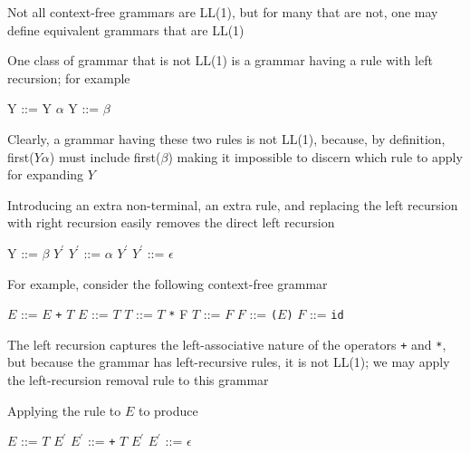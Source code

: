 \documentclass[8pt,a4paper,compress]{beamer}
\newcommand{\mm}[1]{$#1$}
\newcommand{\expo}[2]{$#1^{#2}$}
\newenvironment{spaced}
{
\smallskip
\hspace{.5cm}
\begin{minipage}[c]{\textwidth}
}
{
\end{minipage}
\smallskip
}
\begin{document}
\begin{frame}[fragile]
\pause

Not all context-free grammars are LL(1), but for many that are not, one may define equivalent grammars that are LL(1)

\pause
\bigskip

One class of grammar that is not LL(1) is a grammar having a rule with left recursion; for example 

\text{ }
\begin{spaced}
\begin{production}
Y ::= Y \mm{\alpha}
Y ::= \mm{\beta}
\end{production}
\end{spaced}

\pause

Clearly, a grammar having these two rules is not LL(1), because, by definition, first($Y \alpha$) must include first($\beta$) making it impossible to discern which rule to apply for expanding $Y$

\pause
\bigskip

Introducing an extra non-terminal, an extra rule, and replacing the left recursion with right recursion easily removes the direct left recursion

\text{ }
\begin{spaced}
\begin{production}
Y  ::= \mm{\beta} \expo{Y}{\prime}
\expo{Y}{\prime} ::= \mm{\alpha} \expo{Y}{\prime}
\expo{Y}{\prime} ::= \mm{\epsilon}
\end{production}
\end{spaced}
\end{frame}

\begin{frame}[fragile]
\pause

For example, consider the following context-free grammar

\text{ }
\begin{spaced}
\begin{production}
\mm{E} ::= \mm{E} \lstinline{+} \mm{T}
\mm{E} ::= \mm{T}
\mm{T} ::= \mm{T}  \lstinline{*} {F}
\mm{T} ::= \mm{F}
\mm{F} ::= \lstinline{(}\mm{E}\lstinline{)}
\mm{F} ::= \lstinline{id}
\end{production}
\end{spaced}

\pause

The left recursion captures the left-associative nature of the operators \lstinline{+} and \lstinline{*}, but because the grammar has left-recursive rules, it is not LL(1); we may apply the left-recursion removal rule to this grammar

\pause
\bigskip

Applying the rule to $E$ to produce

\text{ }
\begin{spaced}
\begin{production}
\mm{E}  ::= \mm{T} \expo{E}{\prime}
\expo{E}{\prime} ::= \lstinline{+} \mm{T} \expo{E}{\prime}
\expo{E}{\prime} ::= \mm{\epsilon}
\end{production}
\end{spaced}
\end{frame}
\end{document}
